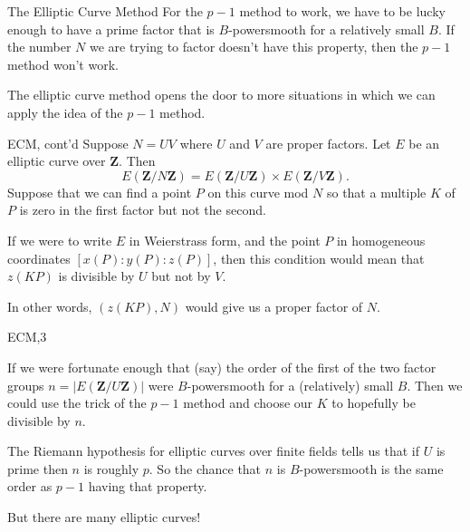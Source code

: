 \documentclass{beamer}
\begin{document}
\begin{frame}{The Elliptic Curve Method}
	For the $p-1$ method to work, we have to be lucky enough to have a prime factor that is $B$-powersmooth for a relatively small $B$.
	If the number $N$ we are trying to factor doesn't have this property, then the $p-1$ method won't work.

	The elliptic curve method opens the door to more situations in which we can apply the idea of the $p-1$ method.
\end{frame}
\begin{frame}{ECM, cont'd}
	Suppose $N=UV$ where $U$ and $V$ are proper factors.  Let $E$ be an elliptic curve over $\mathbf{Z}$.  Then 
	$$
	E(\mathbf{Z}/N\mathbf{Z})=E(\mathbf{Z}/U\mathbf{Z})\times E(\mathbf{Z}/V\mathbf{Z}).
	$$
	Suppose that we can find a point $P$ on this curve mod $N$ so that a multiple $K$ of $P$ is zero in the first factor but not the second.
	
	\bigskip\noindent
	If we were to write $E$ in Weierstrass form, and the point $P$ in homogeneous coordinates $[x(P):y(P):z(P)]$, then this condition
	would mean that $z(KP)$ is divisible by $U$ but not by $V$.  
	
	\bigskip\noindent
	In other words, $(z(KP),N)$ would give us a proper factor of $N$.
\end{frame}
\begin{frame}{ECM,3}

	If we were fortunate enough that (say) the order of the  first of the two factor groups
	$n=|E(\mathbf{Z}/U\mathbf{Z})|$ were $B$-powersmooth for a (relatively) small $B$.
	Then we could use the trick of the $p-1$ method and choose our $K$ to hopefully be divisible by $n$.

	The Riemann hypothesis for elliptic curves over finite fields tells us that if $U$ is prime then $n$ is roughly $p$.
	So the chance that $n$ is $B$-powersmooth is the same order as $p-1$ having that property.

	But there are many elliptic curves! 
\end{frame}







	
\end{document}
